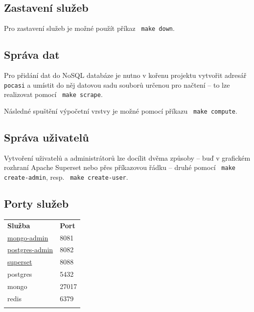 \documentclass[10pt,a4paper,titlepage]{extarticle}
\begin{document}
    \subsection{Zastavení služeb}

    Pro zastavení služeb je možné použít příkaz \texttt{\textdollar\ make down}.

    \subsection{Správa dat}

    Pro přidání dat do NoSQL databáze je nutno v kořenu projektu vytvořit adresář \texttt{pocasi} a umístit do něj
    datovou sadu souborů určenou pro načtení -- to lze realizovat pomocí \texttt{\textdollar\ make scrape}.

    Následné spuštění výpočetní vrstvy je možné pomocí příkazu \texttt{\textdollar\ make compute}.

    \subsection{Správa uživatelů}

    Vytvoření uživatelů a administrátorů lze docílit dvěma způsoby -- buď v grafickém rozhraní Apache Superset nebo
    přes příkazovou řádku -- druhé pomocí \texttt{\textdollar\ make create-admin}, resp. \texttt{\textdollar\ make create-user}.

    \subsection{Porty služeb}
    \begin{longtable}[c]{@{}ll@{}}
        \toprule\addlinespace
        \textbf{Služba} & \textbf{Port}
        \\\addlinespace
        \midrule\endhead
        \href{http://localhost:8081}{mongo-admin} & 8081
        \\\addlinespace
        \href{http://localhost:8082}{postgres-admin} & 8082
        \\\addlinespace
        \href{http://localhost:8088}{superset} & 8088
        \\\addlinespace
        postgres & 5432
        \\\addlinespace
        mongo & 27017
        \\\addlinespace
        redis & 6379
        \\\addlinespace
        \bottomrule
    \end{longtable}
\end{document}
